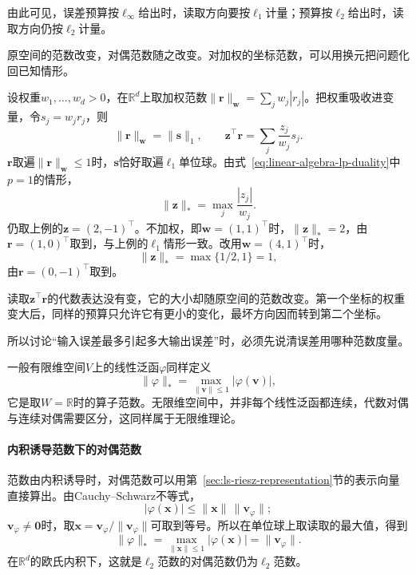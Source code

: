 由此可见，误差预算按$\ell_\infty$给出时，读取方向要按$\ell_1$计量；预算按$\ell_2$给出时，读取方向仍按$\ell_2$计量。

原空间的范数改变，对偶范数随之改变。对加权的坐标范数，可以用换元把问题化回已知情形。
\begin{example}
\label{ex:ls-weighted-dual-norm}
设权重$w_1,\ldots,w_d>0$，在$\mathbb R^d$上取加权范数$\lVert\bm r\rVert_{\bm w}=\sum_jw_j|r_j|$。把权重吸收进变量，令$s_j=w_jr_j$，则
\[
 \lVert\bm r\rVert_{\bm w}=\lVert\bm s\rVert_1,\qquad
 \bm z^\top\bm r=\sum_j\frac{z_j}{w_j}s_j .
\]
$\bm r$取遍$\lVert\bm r\rVert_{\bm w}\leq1$时，$\bm s$恰好取遍$\ell_1$单位球。由式~\eqref{eq:linear-algebra-lp-duality}中$p=1$的情形，
\[
 \lVert\bm z\rVert_*=\max_j\frac{|z_j|}{w_j}.
\]
仍取上例的$\bm z=(2,-1)^\top$。不加权，即$\bm w=(1,1)^\top$时，$\lVert\bm z\rVert_*=2$，由$\bm r=(1,0)^\top$取到，与上例的$\ell_1$情形一致。改用$\bm w=(4,1)^\top$时，
\[
 \lVert\bm z\rVert_*=\max\{1/2,1\}=1,
\]
由$\bm r=(0,-1)^\top$取到。

读取$\bm z^\top\bm r$的代数表达没有变，它的大小却随原空间的范数改变。第一个坐标的权重变大后，同样的预算只允许它有更小的变化，最坏方向因而转到第二个坐标。
\end{example}
所以讨论“输入误差最多引起多大输出误差”时，必须先说清误差用哪种范数度量。

一般有限维空间$V$上的线性泛函$\varphi$同样定义
\[
 \lVert\varphi\rVert_*=\max_{\lVert\bm v\rVert\leq1}|\varphi(\bm v)|,
\]
它是取$W=\mathbb R$时的算子范数。无限维空间中，并非每个线性泛函都连续，代数对偶与连续对偶需要区分，这同样属于无限维理论。

\paragraph{内积诱导范数下的对偶范数}
范数由内积诱导时，对偶范数可以用第~\ref{sec:ls-riesz-representation}节的表示向量直接算出。由Cauchy--Schwarz不等式，
\[
 |\varphi(\bm x)|\leq\lVert\bm x\rVert\,\lVert\bm v_\varphi\rVert ;
\]$\bm v_\varphi\neq\bm0$时，取$\bm x=\bm v_\varphi/\lVert\bm v_\varphi\rVert$可取到等号。所以在单位球上取读取的最大值，得到
\[
 \lVert\varphi\rVert_*=\max_{\lVert\bm x\rVert\leq1}|\varphi(\bm x)|=\lVert\bm v_\varphi\rVert .
\]
在$\mathbb R^d$的欧氏内积下，这就是$\ell_2$范数的对偶范数仍为$\ell_2$范数。
